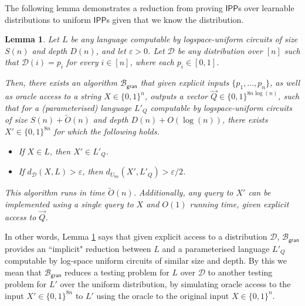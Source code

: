 \documentclass[11pt]{article}
\newtheorem{lemma}[theorem]{Lemma}
\newcommand{\IPP}{\mathsf{IPP}}
\newcommand{\gran}{\mathsf{gran}}
\newcommand{\sD}{\mathcal{D}}
\newcommand{\sB}{\mathcal{B}}
\begin{document}
The following lemma demonstrates a reduction from proving $\IPP$s over learnable distributions to uniform $\IPP$s given that we know the distribution. 

\begin{lemma}
\label{lem:make_uniform_oracle}
Let $L$ be any language computable by logspace-uniform circuits of size $S(n)$ and depth $D(n)$, and let $\varepsilon > 0$. Let $\sD$ be any distribution over $[n]$ such that $\sD(i) = p_i$ for every $i \in [n]$, where each $p_i \in [0,1]$.

Then, there exists an algorithm $\sB_\gran$ that given explicit inputs $\{p_1, \dots, p_n \}$, as well as oracle access to a string $X\in \{0,1\}^{n}$, outputs a vector $\vec{Q} \in \{0,1\}^{8n \log (n)}$, such that for a (parameterised) language $L'_{Q}$ computable by logspace-uniform circuits of size $S(n)+\tilde{O}(n)$ and depth $D(n)+O(\log (n))$, there exists $X'\in \{0,1\}^{8n}$ for which the following holds.
\begin{itemize}
        \item If $X \in L$, then $X' \in L'_Q$.
        \item If $d_\sD (X,L) > \varepsilon$, then $d_{U_{8n}} (X',L'_Q) > \varepsilon/2$.
    \end{itemize}

This algorithm runs in time $\tilde{O}(n)$. Additionally, any query to $X'$ can be implemented using a single query to $X$ and $O(1)$ running time, given explicit access to $\vec{Q}$.
\end{lemma}

In other words, Lemma \ref{lem:make_uniform_oracle} says that given explicit access to a distribution $\sD$, $\sB_\gran$ provides an ``implicit" reduction between  $L$ and a parameterised language $L'_Q$ computable by log-space uniform circuits of similar size and depth. By this we mean that $\sB_\gran$ reduces a testing problem for $L$ over $\sD$ to another testing problem for $L'$ over the uniform distribution, by simulating oracle access to the input $X' \in \{0,1\}^{8n}$ to $L'$ using the oracle to the original input $X \in \{0,1\}^n$.
\end{document}
